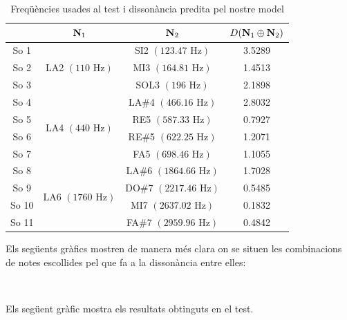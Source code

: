 \documentclass{article}
\theoremstyle{math}
\theoremstyle{TheoremNum}
\newcommand{\0}{\ensuremath{\vb{0}}}
\newcommand{\N}{\ensuremath{\vb{N}}}
\newcommand\Hz{\text{ Hz}}
\begin{document}
\begin{table}[ht]
    \centering
    \begin{tabular}{| c | c | c | c |}
    \cline{2-4}
    \multicolumn{1}{c|}{} & $\N_1$ & $\N_2$ & $D(\N_1\oplus\N_2)$\\
    \hline
    \hline
    So 1 & \multirow{3}{2.5cm}{LA2 $(110\Hz)$} & SI2 $(123.47\Hz)$ & 3.5289\\
    \cline{1-1}\cline{3-4}
    So 2 & & MI3 $(164.81\Hz)$ & 1.4513\\		
    \cline{1-1}\cline{3-4}
    So 3 & & SOL3 $(196\Hz)$  & 2.1898\\
    \hline
    So 4 & \multirow{4}{2.5cm}{LA4 $(440\Hz)$} & LA\#4 $(466.16\Hz)$ & 2.8032 \\
    \cline{1-1}\cline{3-4}
    So 5 & & RE5 $(587.33\Hz)$  & 0.7927 \\
    \cline{1-1}\cline{3-4}
    So 6 & & RE\#5 $(622.25\Hz)$ & 1.2071 \\
    \cline{1-1}\cline{3-4}
    So 7 & & FA5 $(698.46\Hz)$ & 1.1055 \\
    \hline
    So 8 & \multirow{4}{2.5cm}{LA6 $(1760\Hz)$} & LA\#6 $(1864.66\Hz)$ & 1.7028 \\
    \cline{1-1}\cline{3-4}
    So 9 & & DO\#7 $(2217.46\Hz)$ & 0.5485 \\
    \cline{1-1}\cline{3-4}
    So 10 & & MI7 $(2637.02\Hz)$ & 0.1832 \\
    \cline{1-1}\cline{3-4}
    So 11 & & FA\#7 $(2959.96\Hz)$ & 0.4842 \\
    \hline
    \end{tabular}
    \caption{Freqüències usades al test i dissonància predita pel nostre model}
    \label{tab:3}
\end{table}\par
Els següents gràfics mostren de manera més clara on se situen les combinacions de notes escollides pel que fa a la dissonància entre elles:
\begin{center}
    
    \\
    
\end{center}
Els següent gràfic mostra els resultats obtinguts en el test.\par
\end{document}
